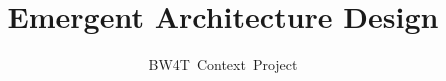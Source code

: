 \documentclass[oneside]{tudelft-report}
\begin{document}
\frontmatter

\title[Blocks World for Teams]{Emergent Architecture Design}
\author{BW4T~Context~Project}
\makecover



\mainmatter
\tableofcontents





\printglossary

%

%
\end{document}
